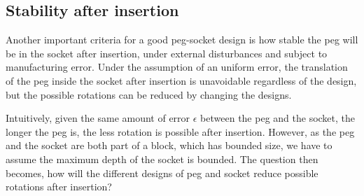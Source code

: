 \documentclass[11pt, twocolumn]{article}
\begin{document}
\subsection{Stability after insertion}

Another important criteria for a good peg-socket design is how stable the peg will be in the socket after insertion, under external disturbances and subject to manufacturing error. Under the assumption of an uniform error, the translation of the peg inside the socket after insertion is unavoidable regardless of the design, but the possible rotations can be reduced by changing the designs. 

Intuitively, given the same amount of error $\epsilon$ between the peg and the socket, the longer the peg is, the less rotation is possible after insertion. However, as the peg and the socket are both part of a block, which has bounded size, we have to assume the maximum depth of the socket is bounded. The question then becomes, how will the different designs of peg and socket reduce possible rotations after insertion? 



\end{document}
